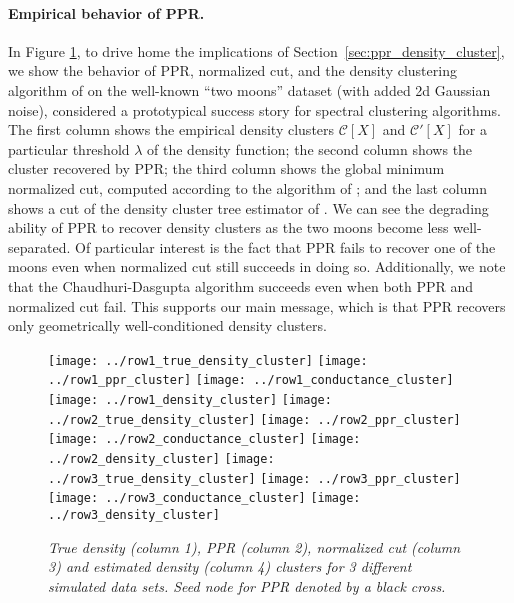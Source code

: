 \documentclass[11pt,twoside]{article}
\newcommand{\1}{\mathbf{1}}
\newcommand{\mc}[1]{\mathcal{#1}}
\begin{document}
\paragraph{Empirical behavior of PPR.} In Figure \ref{fig:moons}, to drive home 
the implications of Section~\ref{sec:ppr_density_cluster}, we show the behavior of PPR,
normalized cut, and the density clustering algorithm of \citet{chaudhuri2010} on
the well-known ``two moons'' dataset (with added 2d Gaussian noise), considered
a prototypical success story for spectral clustering algorithms. The first
column shows the empirical density clusters $\mc{C}[X]$ and $\mc{C}'[X]$ for
a particular threshold $\lambda$ of the density function; the second column
shows the cluster recovered by PPR; the third column shows the global minimum
normalized cut, computed according to the algorithm of \citet{szlam2010}; and
the last column shows a cut of the density cluster tree estimator of
\citet{chaudhuri2010}.  We can see the degrading ability of PPR to recover
density clusters as the two moons become less well-separated. Of particular
interest is the fact that PPR fails to recover one of the moons even when
normalized cut still succeeds in doing so. Additionally, we note that the
Chaudhuri-Dasgupta algorithm succeeds even when both PPR and normalized cut
fail.  This supports our main message, which is that PPR recovers only
geometrically well-conditioned density clusters.

\begin{figure}
	\centering
	\texttt{[image: ../row1\_true\_density\_cluster]}
	\texttt{[image: ../row1\_ppr\_cluster]}
	\texttt{[image: ../row1\_conductance\_cluster]}
	\texttt{[image: ../row1\_density\_cluster]}
	\texttt{[image: ../row2\_true\_density\_cluster]}
	\texttt{[image: ../row2\_ppr\_cluster]}
	\texttt{[image: ../row2\_conductance\_cluster]}
	\texttt{[image: ../row2\_density\_cluster]}
	\texttt{[image: ../row3\_true\_density\_cluster]}
	\texttt{[image: ../row3\_ppr\_cluster]}
	\texttt{[image: ../row3\_conductance\_cluster]}
	\texttt{[image: ../row3\_density\_cluster]}
	\caption{\it\small True density (column 1), PPR (column 2), normalized
		cut (column 3) and estimated density (column 4) clusters for 3 different 
		simulated data sets. Seed node for PPR denoted by a black cross.} 
	\label{fig:moons}
\end{figure}
\end{document}
